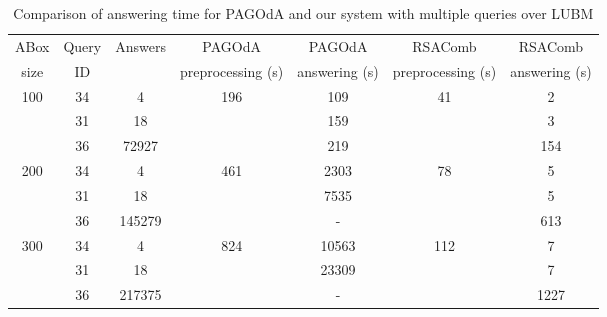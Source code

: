 \documentclass[runningheads]{llncs}
\newcommand{\pagoda}{\mbox{PAGOdA}\xspace}
\newcommand{\rsacomb}{\mbox{RSAComb}\xspace}
\begin{document}
\begin{table}[t]
    \centering
    \caption{Comparison of answering time for \pagoda and our system with multiple queries over LUBM}
    \begin{tabular}{c | c | c | c | c | c | c}
        \hline
        ABox                 & Query          &  Answers     & \pagoda                & \pagoda       & \rsacomb           & \rsacomb      \\
        size                 & ID             &              & preprocessing (s)      & answering (s) & preprocessing (s)  & answering (s) \\
        \hline
        \multirow{3}{*}{100} & 34        & 4                   & \multirow{3}{*}{196}   & 109       & \multirow{3}{*}{41}    & 2       \\
                              \cline{2-3}                                                \cline{5-5}                         \cline{7-7}
                             & 31        & 18                  &                        & 159       &                        & 3       \\
                              \cline{2-3}                                                \cline{5-5}                         \cline{7-7}
                             & 36        & 72927               &                        & 219       &                        & 154     \\
        \hline
        \multirow{3}{*}{200} & 34        & 4                   & \multirow{3}{*}{461}   & 2303      & \multirow{3}{*}{78}    & 5       \\
                              \cline{2-3}                                                \cline{5-5}                         \cline{7-7}
                             & 31        & 18                  &                        & 7535      &                        & 5       \\
                              \cline{2-3}                                                \cline{5-5}                         \cline{7-7}
                             & 36        & 145279              &                        & -         &                        & 613     \\

        \hline
        \multirow{3}{*}{300} & 34        & 4                   & \multirow{3}{*}{824}   & 10563     & \multirow{3}{*}{112}   & 7       \\
                              \cline{2-3}                                                \cline{5-5}                         \cline{7-7}
                             & 31        & 18                  &                        & 23309     &                        & 7       \\
                              \cline{2-3}                                                \cline{5-5}                         \cline{7-7}
                             & 36        & 217375              &                        & -         &                        & 1227    \\


\end{tabular}
\end{table}
\end{document}
